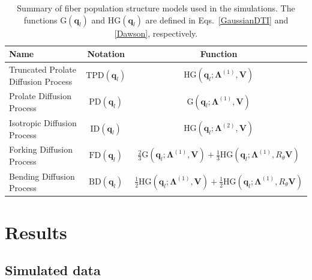 \documentclass[authoryear,preprint,12pt]{elsarticle}
\newcommand{\q}{\mathbf{q}}
\newcommand{\bsL}{\bs{\Lambda}}
\newcommand{\bld}[1]{\mathbf{#1}}
\newcommand{\bs}[1]{\boldsymbol{#1}}
\begin{document}
\begin{table}[tbp]
  \caption{Summary of fiber population structure models used in the
    simulations.  The functions $\text{G}(\q_l)$ and $\text{HG}(\q_l)$
    are defined in Eqs.~\eqref{GaussianDTI} and \eqref{Dawson},
    respectively.}
  \label{simulationtable}
  \begin{center}
    \begin{tabular}{lcc}
      \hline
      \textbf{Name} & \textbf{Notation} & \textbf{Function}\\
      \hline
      Truncated Prolate Diffusion Process & $\text{TPD}(\q_l)$ &
      $\text{HG}(\q_l;\bsL^{(1)},\bld{V})$\\
      Prolate Diffusion Process & $\text{PD}(\q_l)$ &
      $\text{G}(\q_l;\bsL^{(1)},\bld{V})$\\
      Isotropic Diffusion Process & $\text{ID}(\q_l)$ &
      $\text{HG}(\q_l;\bsL^{(2)},\bld{V})$\\
      Forking Diffusion Process & $\text{FD}(\q_l)$ &
      $\frac{2}{3}\text{G}(\q_l;\bsL^{(1)},\bld{V}) +
      \frac{1}{3}\text{HG}(\q_l;\bsL^{(1)},R_\theta\bld{V})$\\
      Bending Diffusion Process & $\text{BD}(\q_l)$ &
      $\frac{1}{2}\text{HG}(\q_l;\bsL^{(1)},\bld{V}) +
      \frac{1}{2}\text{HG}(\q_l;\bsL^{(1)},R_\theta\bld{V})$\\
      \hline
    \end{tabular}
  \end{center}
\end{table}

\section{Results}
\label{results}

\subsection{Simulated data} %
\end{document}
